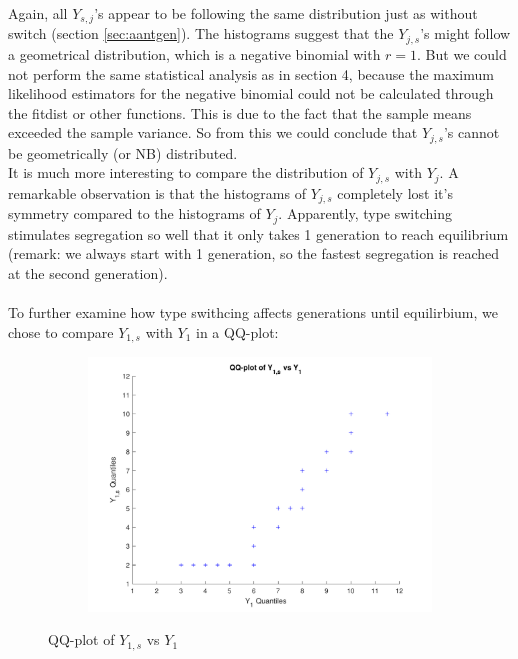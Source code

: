 Again, all $Y_{s,j}$'s appear to be following the same distribution just as without switch (section \ref{sec:aantgen}). 
The histograms suggest that the $Y_{j,s}$'s might follow a geometrical distribution, which is a negative binomial with $r=1$. 
But we could not perform the same statistical analysis as in section 4, because the maximum likelihood estimators for the negative binomial could not be calculated through the fitdist or other functions. 
This is due to the fact that the sample means exceeded the sample variance. So from this we could conclude that $Y_{j,s}$'s cannot be geometrically (or NB) distributed.\\

It is much more interesting to compare the distribution of $Y_{j,s}$ with $Y_{j}$. A remarkable observation is that the histograms of $Y_{j,s}$ completely lost it's symmetry compared to the histograms of $Y_j$. 
Apparently, type switching stimulates segregation so well that it only takes 1 generation to reach equilibrium (remark: we always start with 1 generation, so the fastest segregation is reached at the second generation).\\
\\ 
To further examine how type swithcing affects generations until equilirbium, we chose to compare $Y_{1,s}$ with $Y_1$ in a QQ-plot:

\begin{figure}[H]
    \centering
    \begin{subfigure}{0.8\textwidth}
        \includegraphics[width=\textwidth]{QQplotY1sw.pdf}
    \end{subfigure}
    \caption{QQ-plot of $Y_{1,s}$ vs $Y_1$}
    \label{fig:QQplotSw}
\end{figure}  

